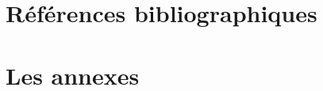 \documentclass{article}           %
\begin{document}

\section{Références bibliographiques}

\begin{thebibliography}{}
\nocite{*}
\printbibliography
\end{thebibliography}



\appendix
\section{Les annexes}
\end{document}
